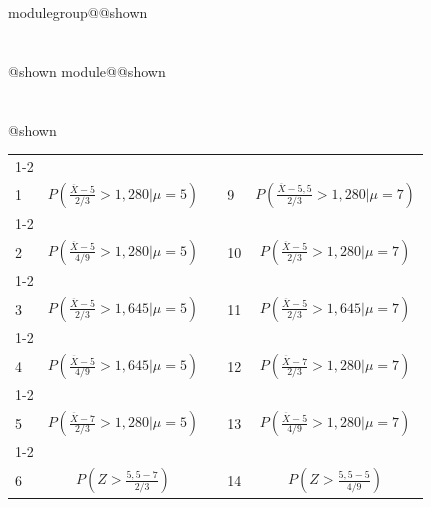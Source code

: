 \documentclass{Evaluation}
\makeatletter
\newcommand{\currentmodulekey}{}
\newcommand{\currentmoduletitle}{}
\newcommand{\currentgroupkey}{}
\newcommand{\currentgrouptitle}{}
\newcommand{\showmoduleifneeded}{%
  \ifx\currentgroupkey\empty\else
    \expandafter\ifx\csname modulegroup@\currentgroupkey @shown\endcsname\relax
      \section*{\currentgrouptitle}%
      \expandafter\gdef\csname modulegroup@\currentgroupkey @shown\endcsname{1}%
    \fi
  \fi
  \expandafter\ifx\csname module@\currentmodulekey @shown\endcsname\relax
    \section*{\currentmoduletitle}%
    \expandafter\gdef\csname module@\currentmodulekey @shown\endcsname{1}%
  \fi
}
\newenvironment{A23}{\showmoduleifneeded}{}
\makeatother
\begin{document}
\begin{questions}
\begin{A23}
\begin{center}
\begin{tabular}{|l|c|c|l|c|}
	\cline{1-2}\cline{4-5}
	&&&&\\[-3mm]
	 1 &  $\displaystyle P\left( \frac{\overline{X}-5}{ 2 / 3} > 1,280 \bigg| \mu = 5 \right)$
	 & \hspace{0.3cm} &
	 9 &  $\displaystyle P\left( \frac{\overline{X}-5,5}{ 2 / 3} > 1,280 \bigg| \mu = 7 \right)$
	\\[4mm]
	\cline{1-2}\cline{4-5}
	&&&&\\[-3mm]
	 2 & $\displaystyle P\left( \frac{\overline{X} - 5}{4/9} > 1,280 \bigg| \mu = 5  \right)$
	&  &
	 10 & $\displaystyle P\left( \frac{\overline{X}-5}{ 2 / 3} > 1,280 \bigg| \mu = 7 \right)$
	\\[4mm]
	\cline{1-2}\cline{4-5}
	&&&&\\[-3mm]
	 3 & $\displaystyle P\left( \frac{\overline{X}-5}{ 2 / 3} > 1,645 \bigg| \mu = 5 \right)$
	 &  &
	  11 & $\displaystyle P\left( \frac{\overline{X}-5}{ 2 / 3} > 1,645 \bigg| \mu = 7 \right)$
	 \\[4mm]
	 \cline{1-2}\cline{4-5}
	 &&&&\\[-3mm]
	   4 & $\displaystyle P\left( \frac{\overline{X} - 5}{4/9} > 1,645 \bigg| \mu = 5  \right)$
	 &  &
	  12 & $\displaystyle P\left( \frac{\overline{X} - 7}{2/3} > 1,280 \bigg| \mu = 7 \right)$
	 \\[4mm]
	 \cline{1-2}\cline{4-5}
	 &&&&\\[-3mm]
	  5 & $\displaystyle P\left( \frac{\overline{X} - 7}{2/3} > 1,280 \bigg| \mu = 5  \right)$
	 &  &
	  13 & $\displaystyle P\left( \frac{\overline{X}-5}{ 4 / 9} > 1,280 \bigg| \mu = 7 \right)$
	 \\[4mm]
	 \cline{1-2}\cline{4-5}
	 &&&&\\[-3mm]
	  6 & $\displaystyle P\left( Z > \frac{5,5-7}{2/3} \right)$
	 &  &
	  14 & $\displaystyle P\left( Z > \frac{5,5-5}{4/9} \right)$

\end{tabular}
\end{center}
\end{A23}
\end{questions}
\end{document}
